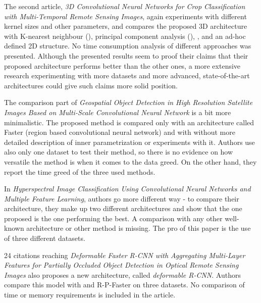 The second article, \textit{3D Convolutional Neural Networks for Crop Classification with Multi-Temporal Remote Sensing Images},  again experiments with different kernel sizes and other parameters, and compares the proposed 3D  architecture with K-nearest neighbour (), principal component analysis (), , and an ad-hoc defined 2D  structure. No time consumption analysis of different approaches was presented. Although the presented results seem to proof their claims that their proposed architecture performs better than the other ones, a more extensive research experimenting with more datasets and more advanced, state-of-the-art architectures could give such claims more solid position. 

The comparison part of \textit{Geospatial Object Detection in High Resolution Satellite Images Based on Multi-Scale Convolutional Neural Network} is a bit more minimalistic. The proposed method is compared only with an architecture called Faster  (region based convolutional neural network) and with  without more detailed description of inner parametrization or experiments with it. Authors use also only one dataset to test their method, so there is no evidence on how versatile the method is when it comes to the data greed. On the other hand, they report the time greed of the three used methods. 

In \textit{Hyperspectral Image Classification Using Convolutional Neural Networks and Multiple Feature Learning}, authors go more different way - to compare their architecture, they make up two different architectures and show that the one proposed is the one performing the best. A comparison with any other well-known architecture or other  method is missing. The pro of this paper is the use of three different datasets.

24 citations reaching \textit{Deformable Faster R-CNN with Aggregating Multi-Layer Features for Partially Occluded Object Detection in Optical Remote Sensing Images} also proposes a new architecture, called \textit{deformable R-CNN}. Authors compare this model with  and R-P-Faster  on three datasets. No comparison of time or memory requirements is included in the article.




